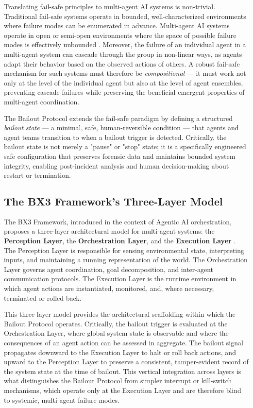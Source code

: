Translating fail-safe principles to multi-agent AI systems is non-trivial. Traditional fail-safe systems operate in bounded, well-characterized environments where failure modes can be enumerated in advance. Multi-agent AI systems operate in open or semi-open environments where the space of possible failure modes is effectively unbounded \cite{tristr81}. Moreover, the failure of an individual agent in a multi-agent system can cascade through the group in non-linear ways, as agents adapt their behavior based on the observed actions of others. A robust fail-safe mechanism for such systems must therefore be \emph{compositional} — it must work not only at the level of the individual agent but also at the level of agent ensembles, preventing cascade failures while preserving the beneficial emergent properties of multi-agent coordination.

The Bailout Protocol extends the fail-safe paradigm by defining a structured \emph{bailout state} — a minimal, safe, human-reversible condition — that agents and agent teams transition to when a bailout trigger is detected. Critically, the bailout state is not merely a "pause" or "stop" state; it is a specifically engineered safe configuration that preserves forensic data and maintains bounded system integrity, enabling post-incident analysis and human decision-making about restart or termination.

\subsection{The BX3 Framework's Three-Layer Model}

The BX3 Framework, introduced in the context of Agentic AI orchestration, proposes a three-layer architectural model for multi-agent systems: the \textbf{Perception Layer}, the \textbf{Orchestration Layer}, and the \textbf{Execution Layer} \cite{bansal2019}. The Perception Layer is responsible for sensing environmental state, interpreting inputs, and maintaining a running representation of the world. The Orchestration Layer governs agent coordination, goal decomposition, and inter-agent communication protocols. The Execution Layer is the runtime environment in which agent actions are instantiated, monitored, and, where necessary, terminated or rolled back.

This three-layer model provides the architectural scaffolding within which the Bailout Protocol operates. Critically, the bailout trigger is evaluated at the Orchestration Layer, where global system state is observable and where the consequences of an agent action can be assessed in aggregate. The bailout signal propagates downward to the Execution Layer to halt or roll back actions, and upward to the Perception Layer to preserve a consistent, tamper-evident record of the system state at the time of bailout. This vertical integration across layers is what distinguishes the Bailout Protocol from simpler interrupt or kill-switch mechanisms, which operate only at the Execution Layer and are therefore blind to systemic, multi-agent failure modes.


